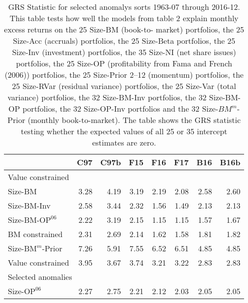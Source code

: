 
\begin{table}[!ht]
\centering
\caption{
\scriptsize{
GRS Statistic for selected anomalys sorts 1963-07 through 2016-12. This table tests how
well the models from table 2 explain monthly excess returns on the 25 Size-BM (book-to-
market) portfolios, the 25 Size-Acc (accruals) portfolios, the 25 Size-Beta portfolios,
the 25 Size-Inv (investment) portfolios, the 35 Size-NI (net share issues) portfolios, the
25 Size-OP (profitability from Fama and French (2006)) portfolios, the 25 Size-Prior 2–12
(momentum) portfolios, the 25 Size-RVar (residual variance) portfolios, the 25 Size-Var
(total variance) portfolios, the 32 Size-BM-Inv portfolios, the 32 Size-BM-OP portfolios,
the 32 Size-OP-Inv portfolios and the 32 Size-$BM^m$-Prior (monthly book-to-market). The
table shows the GRS statistic testing whether the expected values of all 25 or 35
intercept estimates are zero.
}
}
\begin{tabular}{lrrrrrrr}
  \toprule
     & C97  & C97b  & F15  & F16  & F17  & B16  & B16b  \\
  \midrule
  
    \multicolumn{8}{l}{Value constrained} \\
    
    Size-BM  & 3.28  & 4.19  & 3.19  & 2.19  & 2.08  & 2.58  & 2.60  \\
    
  
    
    
    Size-BM-Inv  & 2.58  & 3.44  & 2.32  & 1.56  & 1.49  & 2.13  & 2.13  \\
    
  
    
    
    Size-BM-$\text{OP}^{06}$  & 2.22  & 3.19  & 2.15  & 1.15  & 1.15  & 1.57  & 1.67  \\
    
  
    
    
    BM constrained  & 2.31  & 2.69  & 2.14  & 1.62  & 1.58  & 1.81  & 1.82  \\
    [1em]
  
    
    
    Size-$\text{BM}^m$-Prior  & 7.26  & 5.91  & 7.55  & 6.52  & 6.51  & 4.85  & 4.85  \\
    
  
    
    
    Value constrained  & 3.95  & 3.67  & 3.74  & 3.21  & 3.22  & 2.83  & 2.83  \\
    [1em]
  
    
    \multicolumn{8}{l}{Selected anomalies} \\
    Size-$\text{OP}^{06}$  & 2.27  & 2.75  & 2.21  & 2.12  & 2.03  & 2.05  & 2.05  \\
    

\end{tabular}
\end{table}
